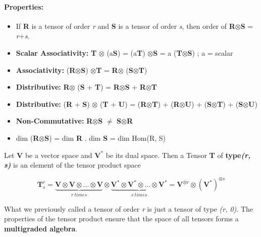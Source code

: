 \paragraph{\textbf{Properties:}}
\begin{itemize}
    \itemsep0em
    \item If \textbf{R} is a tensor of order \textit{r} and \textbf{S} is a tensor of order \textit{s}, then order of \textbf{R}$\otimes$\textbf{S} = \textit{r}+\textit{s}.
    \item \textbf{Scalar Associativity: } \textbf{T} $\otimes$ (a\textbf{S}) = (a\textbf{T}) $\otimes$\textbf{S} = a (\textbf{T}$\otimes$\textbf{S}) \hspace{2cm}; a = scalar
    \item \textbf{Associativity: } (\textbf{R}$\otimes$\textbf{S}) $\otimes$\textbf{T} = \textbf{R}$\otimes$ (\textbf{S}$\otimes$\textbf{T})
    \item \textbf{Distributive: } \textbf{R}$\otimes$ (\textbf{S} + \textbf{T}) = \textbf{R}$\otimes$\textbf{S} + \textbf{R}$\otimes$\textbf{T}
    \item \textbf{Distributive: } (\textbf{R} + \textbf{S}) $\otimes$ (\textbf{T} + \textbf{U}) = (\textbf{R}$\otimes$\textbf{T}) + (\textbf{R}$\otimes$\textbf{U}) + (\textbf{S}$\otimes$\textbf{T}) + (\textbf{S}$\otimes$\textbf{U}) 
    \item \textbf{Non-Commutative: } \textbf{R}$\otimes$\textbf{S} $\neq$ \textbf{S}$\otimes$\textbf{R}
    \item dim (\textbf{R}$\otimes$\textbf{S}) = dim \textbf{R} . dim \textbf{S} = dim Hom(R, S)
\end{itemize}

Let \textbf{V} be a  vector space and $\textbf{V}^*$ be its dual space. Then a Tensor \textbf{T}
of \textbf{type\textit{(r, s)}} is an element of the tensor product space

\begin{equation}
    \textbf{T}_s^r = \underbrace{\textbf{V} \otimes \textbf{V} \otimes ... \otimes \textbf{V}}_{r \:times} \otimes \underbrace{\textbf{V}^* \otimes \textbf{V}^* \otimes ... \otimes \textbf{V}^*}_{s\: times} = \textbf{V}^{\otimes r} \otimes (\textbf{V}^*)^{\otimes s}
\end{equation}

What we previously called a tensor of order \textit{r} is just a tensor of type \textit{(r, 0)}.
The properties of the tensor product ensure that the space of all tensors forms a
\textbf{multigraded algebra}.

